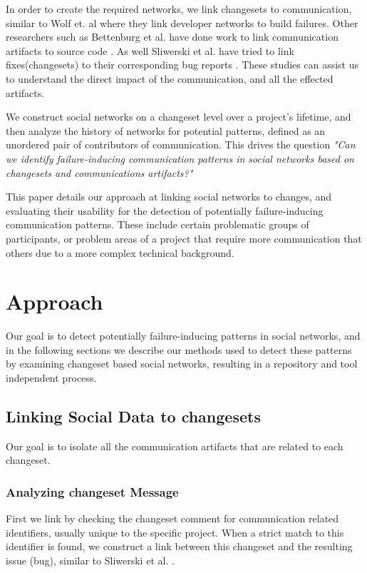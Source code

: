 \documentclass[conference]{IEEEtran}
\begin{document}
In order to create the required networks, we link changesets to communication, similar to Wolf et. al where they link developer networks to build failures\cite{4721184}.  Other researchers such as Bettenburg et al. have done work to link communication artifacts to source code \cite{Bettenburg:2008:ESI:1370750.1370757}.  As well Sliwerski et al. have tried to link fixes(changesets) to their corresponding bug reports \cite{Sliwerski:2005:CIF:1083142.1083147}.  These studies can assist us to understand the direct impact of the communication, and all the effected artifacts.  

We construct social networks on a changeset level over a project's lifetime, and then analyze the history of networks for potential patterns, defined as an unordered pair of contributors of communication.  This drives the question \textit{"Can we identify failure-inducing communication patterns in social networks based on changesets and communications artifacts?"} 

This paper details our approach at linking social networks to changes, and evaluating their usability for the detection of potentially failure-inducing communication patterns. These include certain problematic groups of participants, or problem areas of a project that require more communication that others due to a more complex technical background.

\section{Approach}
Our goal is to detect potentially failure-inducing patterns in social networks, and in the following sections we describe our methods used to detect these patterns by examining changeset based social networks, resulting in a repository and tool independent process. 

\subsection{Linking Social Data to changesets}
Our goal is to isolate all the communication artifacts that are related to each changeset.  
\subsubsection{Analyzing changeset Message}
First we link by checking the changeset comment for communication related identiﬁers, usually unique to the speciﬁc project. When a strict match to this identiﬁer is found, we construct a link between this changeset and the resulting issue (bug), similar to Sliwerski et al. \cite{Sliwerski:2005:CIF:1083142.1083147}.
\end{document}
